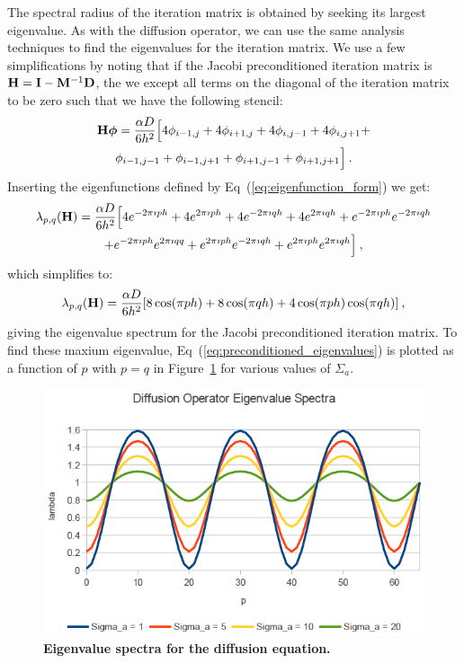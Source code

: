 The spectral radius of the iteration matrix is obtained by seeking its
largest eigenvalue. As with the diffusion operator, we can use the
same analysis techniques to find the eigenvalues for the iteration
matrix. We use a few simplifications by noting that if the Jacobi
preconditioned iteration matrix is $\mathbf{H} = \mathbf{I} -
\mathbf{M}^{-1}\mathbf{D}$, the we except all terms on the diagonal of the
iteration matrix to be zero such that we have the following stencil:
\begin{multline}
  \mathbf{H}\boldsymbol{\phi} = \frac{\alpha D}{6h^2}\Big[4 \phi_{i-1,j} +
    4 \phi_{i+1,j} + 4 \phi_{i,j-1} + 4 \phi_{i,j+1}
    +\\ \phi_{i-1,j-1} + \phi_{i-1,j+1} + \phi_{i+1,j-1} +
    \phi_{i+1,j+1}\Big]\:.
  \label{eq:iteration_stencil}
\end{multline}
Inserting the eigenfunctions defined by
Eq~(\ref{eq:eigenfunction_form}) we get:
\begin{multline}
  \lambda_{p,q}(\mathbf{H}) = \frac{\alpha D}{6h^2}\Big[4 e^{-2 \pi \imath p
      h} + 4 e^{2 \pi \imath p h} + 4 e^{-2 \pi \imath q h} + 4 e^{2
      \pi \imath q h} + e^{-2 \pi \imath p h} e^{-2 \pi \imath q h}
    \\ + e^{-2 \pi \imath p h} e^{2 \pi \imath q q} + e^{2 \pi \imath
      p h} e^{-2 \pi \imath q h} + e^{2 \pi \imath p h} e^{2 \pi
      \imath q h}\Big]\:,
  \label{eq:iteration_deriv}
\end{multline}
which simplifies to:
\begin{equation}
  \lambda_{p,q}(\mathbf{H}) = \frac{\alpha D}{6h^2}[ 8 \cos(\pi p h) + 8
    \cos(\pi q h) + 4 \cos(\pi p h) \cos(\pi q h)]\:,
  \label{eq:iteration_spectrum}
\end{equation}
giving the eigenvalue spectrum for the Jacobi preconditioned iteration
matrix. To find these maxium eigenvalue,
Eq~(\ref{eq:preconditioned_eigenvalues}) is plotted as a function of
$p$ with $p=q$ in Figure~\ref{fig:diffusion_spectrum} for various
values of $\Sigma_a$.
\begin{figure}[t!]
  \begin{center}
    \includegraphics[width=5in,clip]{chapters/parallel_mc/diffusion_spectrum.png}
  \end{center}
  \caption{\textbf{Eigenvalue spectra for the diffusion equation.}}
  \label{fig:diffusion_spectrum}
\end{figure}
